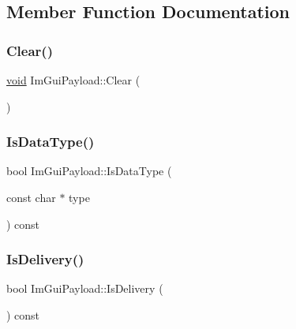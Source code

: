 \subsection{Member Function Documentation}
\mbox{\label{structImGuiPayload_a88c2293d356eb05e7a30d7693de186f2}} 
\subsubsection{\texorpdfstring{Clear()}{Clear()}}
{\footnotesize\ttfamily \hyperlink{imgui__impl__opengl3__loader_8h_ac668e7cffd9e2e9cfee428b9b2f34fa7}{void} Im\+Gui\+Payload\+::\+Clear (\begin{DoxyParamCaption}{ }\end{DoxyParamCaption})\hspace{0.3cm}{\ttfamily [inline]}}

\mbox{\label{structImGuiPayload_a7864aeb80bc28683748d015562eead4d}} 
\subsubsection{\texorpdfstring{Is\+Data\+Type()}{IsDataType()}}
{\footnotesize\ttfamily bool Im\+Gui\+Payload\+::\+Is\+Data\+Type (\begin{DoxyParamCaption}\item[{const char $\ast$}]{type }\end{DoxyParamCaption}) const\hspace{0.3cm}{\ttfamily [inline]}}

\mbox{\label{structImGuiPayload_adcc193e0d454bf394e76e5498eea808d}} 
\subsubsection{\texorpdfstring{Is\+Delivery()}{IsDelivery()}}
{\footnotesize\ttfamily bool Im\+Gui\+Payload\+::\+Is\+Delivery (\begin{DoxyParamCaption}{ }\end{DoxyParamCaption}) const\hspace{0.3cm}{\ttfamily [inline]}}

